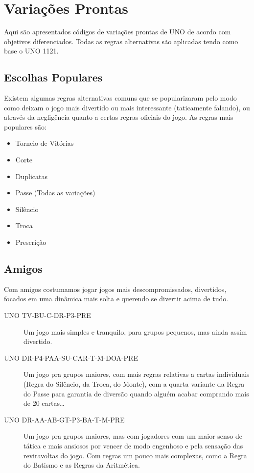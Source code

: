 \section{Variações Prontas}

Aqui são apresentados códigos de variações prontas de UNO de acordo com objetivos diferenciados. Todas as regras alternativas são aplicadas tendo como base o UNO 1121.

\subsection{Escolhas Populares}

Existem algumas regras alternativas comuns que se popularizaram pelo modo como deixam o jogo mais divertido ou mais interessante (taticamente falando), ou através da negligência quanto a certas regras oficiais do jogo. As regras mais populares são:

\begin{itemize}
\item{Torneio de Vitórias}
\item{Corte}
\item{Duplicatas}
\item{Passe (Todas as variações)}
\item{Silêncio}
\item{Troca}
\item{Prescrição}
\end{itemize}

\subsection{Amigos}

Com amigos costumamos jogar jogos mais descompromissados, divertidos, focados em uma dinâmica mais solta e querendo se divertir acima de tudo.

\begin{description}
\item[UNO TV-BU-C-DR-P3-PRE]{Um jogo mais simples e tranquilo, para grupos pequenos, mas ainda assim divertido.}
\item[UNO DR-P4-PAA-SU-CAR-T-M-DOA-PRE]{Um jogo pra grupos maiores, com mais regras relativas a cartas individuais (Regra do Silêncio, da Troca, do Monte), com a quarta variante da Regra do Passe para garantia de diversão quando alguém acabar comprando mais de 20 cartas\ldots}
\item[UNO DR-AA-AB-GT-P3-BA-T-M-PRE]{Um jogo pra grupos maiores, mas com jogadores com um maior senso de tática e mais ansiosos por vencer de modo engenhoso e pela sensação das reviravoltas do jogo. Com regras um pouco mais complexas, como a Regra do Batismo e as Regras da Aritmética.}
\end{description}

